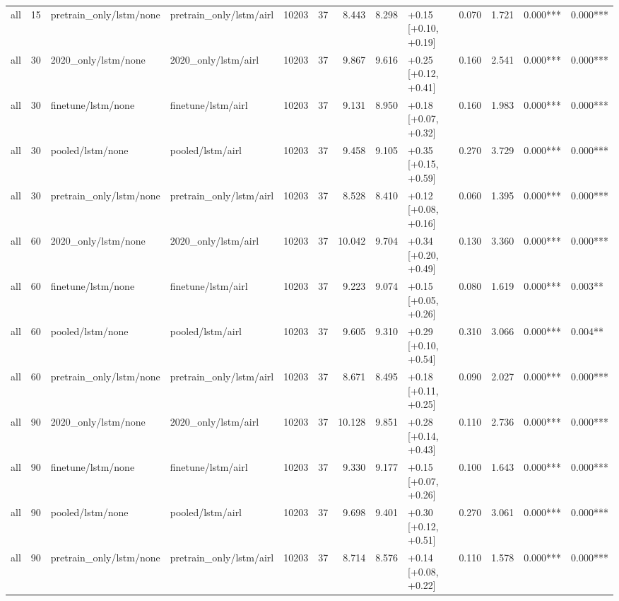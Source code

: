 \begin{tabular}{lrllrrrrlrrll}
all & 15 & pretrain_only/lstm/none & pretrain_only/lstm/airl & 10203 & 37 & 8.443 & 8.298 & +0.15 [+0.10, +0.19] & 0.070 & 1.721 & 0.000*** & 0.000*** \\
all & 30 & 2020_only/lstm/none & 2020_only/lstm/airl & 10203 & 37 & 9.867 & 9.616 & +0.25 [+0.12, +0.41] & 0.160 & 2.541 & 0.000*** & 0.000*** \\
all & 30 & finetune/lstm/none & finetune/lstm/airl & 10203 & 37 & 9.131 & 8.950 & +0.18 [+0.07, +0.32] & 0.160 & 1.983 & 0.000*** & 0.000*** \\
all & 30 & pooled/lstm/none & pooled/lstm/airl & 10203 & 37 & 9.458 & 9.105 & +0.35 [+0.15, +0.59] & 0.270 & 3.729 & 0.000*** & 0.000*** \\
all & 30 & pretrain_only/lstm/none & pretrain_only/lstm/airl & 10203 & 37 & 8.528 & 8.410 & +0.12 [+0.08, +0.16] & 0.060 & 1.395 & 0.000*** & 0.000*** \\
all & 60 & 2020_only/lstm/none & 2020_only/lstm/airl & 10203 & 37 & 10.042 & 9.704 & +0.34 [+0.20, +0.49] & 0.130 & 3.360 & 0.000*** & 0.000*** \\
all & 60 & finetune/lstm/none & finetune/lstm/airl & 10203 & 37 & 9.223 & 9.074 & +0.15 [+0.05, +0.26] & 0.080 & 1.619 & 0.000*** & 0.003** \\
all & 60 & pooled/lstm/none & pooled/lstm/airl & 10203 & 37 & 9.605 & 9.310 & +0.29 [+0.10, +0.54] & 0.310 & 3.066 & 0.000*** & 0.004** \\
all & 60 & pretrain_only/lstm/none & pretrain_only/lstm/airl & 10203 & 37 & 8.671 & 8.495 & +0.18 [+0.11, +0.25] & 0.090 & 2.027 & 0.000*** & 0.000*** \\
all & 90 & 2020_only/lstm/none & 2020_only/lstm/airl & 10203 & 37 & 10.128 & 9.851 & +0.28 [+0.14, +0.43] & 0.110 & 2.736 & 0.000*** & 0.000*** \\
all & 90 & finetune/lstm/none & finetune/lstm/airl & 10203 & 37 & 9.330 & 9.177 & +0.15 [+0.07, +0.26] & 0.100 & 1.643 & 0.000*** & 0.000*** \\
all & 90 & pooled/lstm/none & pooled/lstm/airl & 10203 & 37 & 9.698 & 9.401 & +0.30 [+0.12, +0.51] & 0.270 & 3.061 & 0.000*** & 0.000*** \\
all & 90 & pretrain_only/lstm/none & pretrain_only/lstm/airl & 10203 & 37 & 8.714 & 8.576 & +0.14 [+0.08, +0.22] & 0.110 & 1.578 & 0.000*** & 0.000*** \\
\bottomrule
\end{tabular}
